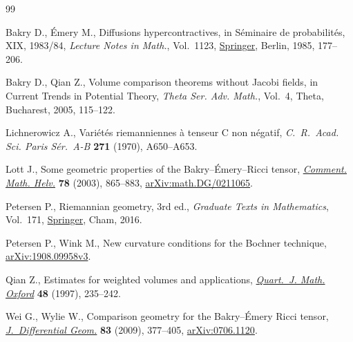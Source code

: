 \begin{thebibliography}{99}
\footnotesize\itemsep=0pt

Bakry D., \'{E}mery M., Diffusions hypercontractives, in S\'eminaire de
 probabilit\'es, {XIX}, 1983/84, \textit{Lecture Notes in Math.}, Vol.~1123,
 \href{https://doi.org/10.1007/BFb0075847}{Springer}, Berlin, 1985, 177--206.

Bakry D., Qian Z., Volume comparison theorems without {J}acobi fields, in
 Current Trends in Potential Theory, \textit{Theta Ser. Adv. Math.}, Vol.~4,
 Theta, Bucharest, 2005, 115--122.

Lichnerowicz A., Vari\'et\'es riemanniennes \`a tenseur {C} non n\'egatif,
 \textit{C.~R.~Acad. Sci. Paris S\'er.~A-B} \textbf{271} (1970), A650--A653.

Lott J., Some geometric properties of the {B}akry--\'{E}mery--{R}icci tensor,
 \href{https://doi.org/10.1007/s00014-003-0775-8}{\textit{Comment. Math. Helv.}} \textbf{78} (2003), 865--883, \href{https://arxiv.org/abs/math.DG/0211065}{arXiv:math.DG/0211065}.

Petersen P., Riemannian geometry, 3rd ed., \textit{Graduate Texts in Mathematics}, Vol.~171, \href{https://doi.org/10.1007/978-3-319-26654-1}{Springer}, Cham, 2016.

Petersen P., Wink M., New curvature conditions for the {B}ochner technique,
 \href{https://arxiv.org/abs/1908.09958v3}{arXiv:1908.09958v3}.

Qian Z., Estimates for weighted volumes and applications, \href{https://doi.org/10.1093/qmath/48.2.235}{\textit{Quart.~J.
 Math. Oxford}} \textbf{48} (1997), 235--242.

Wei G., Wylie W., Comparison geometry for the {B}akry--\'{E}mery {R}icci tensor,
 \href{https://doi.org/10.4310/jdg/1261495336}{\textit{J.~Differential Geom.}} \textbf{83} (2009), 377--405, \href{https://arxiv.org/abs/0706.1120}{arXiv:0706.1120}.

\end{thebibliography}
